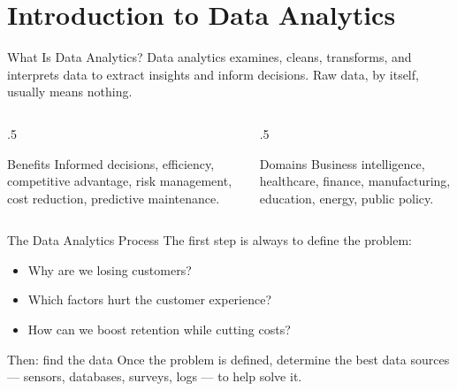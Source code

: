 \documentclass[9pt,aspectratio=169,xcolor=table]{beamer}
\begin{document}
\section{Introduction to Data Analytics}

\begin{frame}{What Is Data Analytics?}
    \leavevmode
    \alert{Data analytics} examines, cleans, transforms, and interprets
    data to extract insights and inform decisions. Raw data, by itself,
    usually means nothing.

    \vspace{3mm}
    \begin{columns}[t]
        \begin{column}{.5\textwidth}
            \begin{block}{Benefits}
                \scriptsize Informed decisions, efficiency, competitive
                advantage, risk management, cost reduction, predictive
                maintenance.
            \end{block}
        \end{column}
        \begin{column}{.5\textwidth}
            \begin{block}{Domains}
                \scriptsize Business intelligence, healthcare, finance,
                manufacturing, education, energy, public policy.
            \end{block}
        \end{column}
    \end{columns}
\end{frame}

\begin{frame}{The Data Analytics Process}
    \leavevmode
    The first step is always to \alert{define the problem}:
    \begin{itemize}
        \item Why are we losing customers?
        \item Which factors hurt the customer experience?
        \item How can we boost retention while cutting costs?
    \end{itemize}

    \vspace{3mm}
    \begin{block}{Then: find the data}
        Once the problem is defined, determine the best data sources ---
        sensors, databases, surveys, logs --- to help solve it.
    \end{block}
\end{frame}
\end{document}
